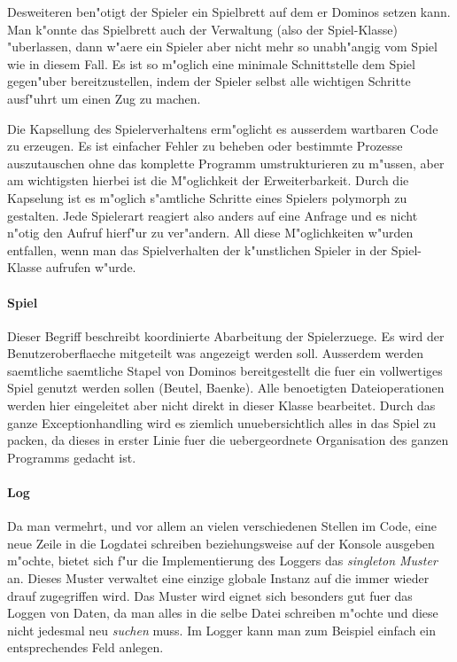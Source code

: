 Desweiteren ben"otigt der Spieler ein Spielbrett auf dem er Dominos setzen kann. Man k"onnte das Spielbrett auch der Verwaltung (also der Spiel-Klasse) "uberlassen, dann w"aere ein Spieler aber nicht mehr so unabh"angig vom Spiel wie in diesem Fall. Es ist so m"oglich eine minimale Schnittstelle dem Spiel gegen"uber bereitzustellen, indem der Spieler selbst alle wichtigen Schritte ausf"uhrt um einen Zug zu machen. 

Die Kapsellung des Spielerverhaltens erm"oglicht es ausserdem wartbaren Code zu erzeugen. Es ist einfacher Fehler zu beheben oder bestimmte Prozesse auszutauschen ohne das komplette Programm umstrukturieren zu m"ussen, aber am wichtigsten hierbei ist die M"oglichkeit der Erweiterbarkeit. 
Durch die Kapselung ist es m"oglich s"amtliche Schritte eines Spielers polymorph zu gestalten. Jede Spielerart reagiert also anders auf eine Anfrage und es nicht n"otig den Aufruf hierf"ur zu ver"andern. All diese M"oglichkeiten w"urden entfallen, wenn man das Spielverhalten der k"unstlichen Spieler in der Spiel-Klasse aufrufen w"urde.

\paragraph{Spiel}
Dieser Begriff beschreibt koordinierte Abarbeitung der Spielerzuege. Es wird der Benutzeroberflaeche mitgeteilt was angezeigt werden soll. Ausserdem werden saemtliche saemtliche Stapel von Dominos bereitgestellt die fuer ein vollwertiges Spiel genutzt werden sollen (Beutel, Baenke). Alle benoetigten Dateioperationen werden hier eingeleitet aber nicht direkt in dieser Klasse bearbeitet. Durch das ganze Exceptionhandling wird es ziemlich unuebersichtlich alles in das Spiel zu packen, da dieses in erster Linie fuer die uebergeordnete Organisation des ganzen Programms gedacht ist. 

\paragraph{Log}
Da man vermehrt, und vor allem an vielen verschiedenen Stellen im Code, eine neue Zeile in die Logdatei schreiben beziehungsweise auf der Konsole ausgeben m"ochte, bietet sich f"ur die Implementierung des Loggers das \emph{singleton Muster} an. Dieses Muster verwaltet eine einzige globale Instanz auf die immer wieder drauf zugegriffen wird. Das Muster wird eignet sich besonders gut fuer das Loggen von Daten, da man alles in die selbe Datei schreiben m"ochte und diese nicht jedesmal neu \emph{suchen} muss. Im Logger kann man zum Beispiel einfach ein entsprechendes Feld anlegen. 

